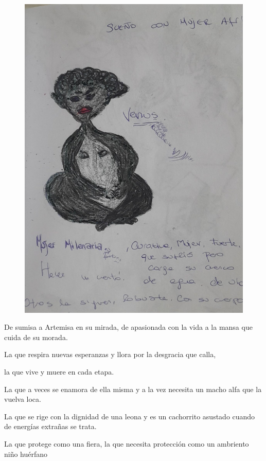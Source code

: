 \documentclass[12pt, a4paper, twoside]{book} %
\begin{document}
\begin{figure}[H]
	\centering
	\includegraphics[width=\textwidth]{./images/1f81324df27a62.jpg}
\end{figure}

De sumisa a Artemisa en su mirada, de apasionada con la vida a la mansa que cuida de su morada.

La que respira nuevas esperanzas y llora por la desgracia que calla,

la que vive y muere en cada etapa.

La que a veces se enamora de ella misma y a la vez necesita un macho alfa que la vuelva loca.

La que se rige con la dignidad de una leona y es un cachorrito asustado cuando de energías extrañas se trata.

La que protege como una fiera, la que necesita protección como un ambriento niño huérfano
\end{document}
